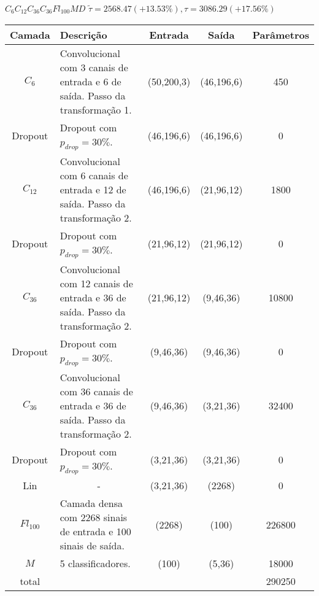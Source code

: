 \begin{tiny}
\begin{table}[H]
	$C_6C_{12}C_{36}C_{36}Fl_{100}MD$ $\tilde{\tau}=2568.47 (+13.53\%), \tau=3086.29 (+17.56\%)$\newline
	\begin{tabularx}{\linewidth}{ |c|X|c|c|c| }
		\hline
		Camada & Descrição & Entrada & Saída & Parâmetros \\ \hline
		$C_{6}$ & Convolucional com 3 canais de entrada e 6 de saída. Passo da transformação 1. & (50,200,3) & (46,196,6) & 450 \\ \hline
		Dropout & Dropout com $p_{drop} = 30\%$. & (46,196,6) & (46,196,6) & 0 \\ \hline
		$C_{12}$ & Convolucional com 6 canais de entrada e 12 de saída. Passo da transformação 2. & (46,196,6) & (21,96,12) & 1800 \\ \hline
		Dropout & Dropout com $p_{drop} = 30\%$. & (21,96,12) & (21,96,12) & 0 \\ \hline
		$C_{36}$ & Convolucional com 12 canais de entrada e 36 de saída. Passo da transformação 2. & (21,96,12) & (9,46,36) & 10800 \\ \hline
		Dropout & Dropout com $p_{drop} = 30\%$. & (9,46,36) & (9,46,36) & 0 \\ \hline
		$C_{36}$ & Convolucional com 36 canais de entrada e 36 de saída. Passo da transformação 2. & (9,46,36) & (3,21,36) & 32400 \\ \hline
		Dropout & Dropout com $p_{drop} = 30\%$. & (3,21,36) & (3,21,36) & 0 \\ \hline
		Lin & \multicolumn{1}{c|}{-} & (3,21,36) & (2268) & 0 \\ \hline
		$Fl_{100}$ & Camada densa com 2268 sinais de entrada e 100 sinais de saída. & (2268) & (100) & 226800 \\ \hline
		$M$ & 5 classificadores. & (100) & (5,36) & 18000 \\ \hline
		total &  &  &  & 290250 \\ \hline
	\end{tabularx}
\end{table}


\end{tiny}
